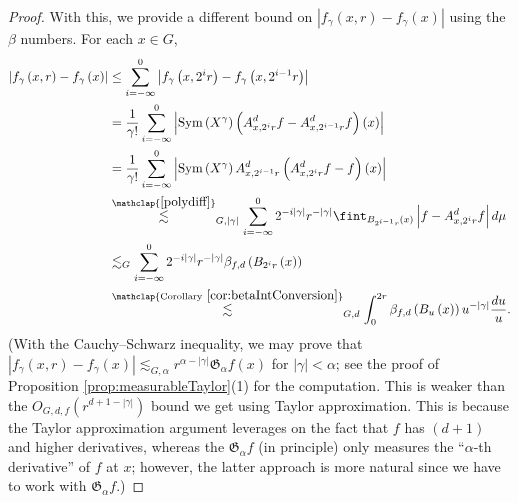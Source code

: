 \documentclass[11pt,reqno]{amsart}
\newcommand{\1}{\mathbf 1}
\begin{document}
\begin{proof}
With this, we provide a different bound on $\left|f_\gamma\left(x,r\right)-f_\gamma\left(x\right)\right|$ using the $\beta$ numbers. For each $x\in G$,
\begin{align}\label{r-approx}
\begin{aligned}
    \left|f_\gamma \left(x,r\right)-f_\gamma\left(x\right)\right|&\le \sum_{i=-\infty}^0\left|f_\gamma \left(x,2^ir\right)-f_\gamma\left(x,2^{i-1}r\right)\right|\\
    &= \frac{1}{\gamma!} \sum_{i=-\infty}^0\left|\operatorname{Sym}\left(X^\gamma\right)\left(A^d_{x,2^ir}f-A^d_{x,2^{i-1}r}f\right)\left(x\right)\right|\\
    &= \frac{1}{\gamma!} \sum_{i=-\infty}^0\left|\operatorname{Sym}\left(X^\gamma\right)A^d_{x,2^{i-1}r}\left(A^d_{x,2^ir}f-f\right)\left(x\right)\right|\\
    &\stackrel{\mathclap{\eqref{polydiff}}}{\lesssim}_{G,\left|\gamma\right|}  \sum_{i=-\infty}^0 2^{-i\left|\gamma\right|}r^{-\left|\gamma\right|}\fint_{B_{2^{i-1}r}\left(x\right)}\left|f-A^d_{x,2^ir}f\right|d\mu\\
    &\lesssim_{G}  \sum_{i=-\infty}^0 2^{-i\left|\gamma\right|}r^{-\left|\gamma\right|}\beta_{f,d}\left(B_{2^ir}\left(x\right)\right)\\
    &\stackrel{\mathclap{\mathrm{Corollary}~\ref{cor:betaIntConversion}}}{\lesssim}_{G,d} \int_0^{2r} \beta_{f,d}\left(B_u\left(x\right)\right)u^{-\left|\gamma\right|}\frac{du}{u}.
\end{aligned}
\end{align}
(With the Cauchy--Schwarz inequality, we may prove that $\left|f_\gamma \left(x,r\right)-f_\gamma\left(x\right)\right|\lesssim_{G,\alpha} r^{\alpha-\left|\gamma\right|}\mathfrak{G}_\alpha f\left(x\right)$ for $\left|\gamma\right|<\alpha$; see the proof of Proposition \ref{prop:measurableTaylor}(1) for the computation. This is weaker than the $O_{G,d,f}\left(r^{d+1-\left|\gamma\right|}\right)$ bound we get using Taylor approximation. This is because the Taylor approximation argument leverages on the fact that $f$ has $\left(d+1\right)$ and higher derivatives, whereas the $\mathfrak{G}_\alpha f$ (in principle) only measures the ``$\alpha$-th derivative'' of $f$ at $x$; however, the latter approach is more natural since we have to work with $\mathfrak{G}_\alpha f$.)


\end{proof}
\end{document}
